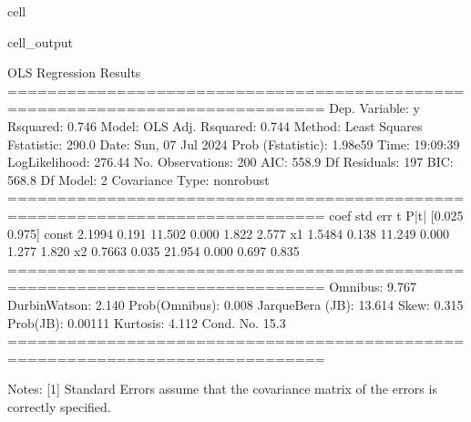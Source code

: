 \documentclass[letterpaper,10pt,english]{jupyterBook}
\begin{document}
\begin{sphinxuseclass}{cell}
\begin{sphinxVerbatimOutput}
\begin{sphinxuseclass}{cell_output}
\begin{sphinxVerbatim}[commandchars=\\\{\}]
                            OLS Regression Results                            
==============================================================================
Dep. Variable:                      y   R\PYGZhy{}squared:                       0.746
Model:                            OLS   Adj. R\PYGZhy{}squared:                  0.744
Method:                 Least Squares   F\PYGZhy{}statistic:                     290.0
Date:                Sun, 07 Jul 2024   Prob (F\PYGZhy{}statistic):           1.98e\PYGZhy{}59
Time:                        19:09:39   Log\PYGZhy{}Likelihood:                \PYGZhy{}276.44
No. Observations:                 200   AIC:                             558.9
Df Residuals:                     197   BIC:                             568.8
Df Model:                           2                                         
Covariance Type:            nonrobust                                         
==============================================================================
                 coef    std err          t      P\PYGZgt{}|t|      [0.025      0.975]
\PYGZhy{}\PYGZhy{}\PYGZhy{}\PYGZhy{}\PYGZhy{}\PYGZhy{}\PYGZhy{}\PYGZhy{}\PYGZhy{}\PYGZhy{}\PYGZhy{}\PYGZhy{}\PYGZhy{}\PYGZhy{}\PYGZhy{}\PYGZhy{}\PYGZhy{}\PYGZhy{}\PYGZhy{}\PYGZhy{}\PYGZhy{}\PYGZhy{}\PYGZhy{}\PYGZhy{}\PYGZhy{}\PYGZhy{}\PYGZhy{}\PYGZhy{}\PYGZhy{}\PYGZhy{}\PYGZhy{}\PYGZhy{}\PYGZhy{}\PYGZhy{}\PYGZhy{}\PYGZhy{}\PYGZhy{}\PYGZhy{}\PYGZhy{}\PYGZhy{}\PYGZhy{}\PYGZhy{}\PYGZhy{}\PYGZhy{}\PYGZhy{}\PYGZhy{}\PYGZhy{}\PYGZhy{}\PYGZhy{}\PYGZhy{}\PYGZhy{}\PYGZhy{}\PYGZhy{}\PYGZhy{}\PYGZhy{}\PYGZhy{}\PYGZhy{}\PYGZhy{}\PYGZhy{}\PYGZhy{}\PYGZhy{}\PYGZhy{}\PYGZhy{}\PYGZhy{}\PYGZhy{}\PYGZhy{}\PYGZhy{}\PYGZhy{}\PYGZhy{}\PYGZhy{}\PYGZhy{}\PYGZhy{}\PYGZhy{}\PYGZhy{}\PYGZhy{}\PYGZhy{}\PYGZhy{}\PYGZhy{}
const          2.1994      0.191     11.502      0.000       1.822       2.577
x1             1.5484      0.138     11.249      0.000       1.277       1.820
x2             0.7663      0.035     21.954      0.000       0.697       0.835
==============================================================================
Omnibus:                        9.767   Durbin\PYGZhy{}Watson:                   2.140
Prob(Omnibus):                  0.008   Jarque\PYGZhy{}Bera (JB):               13.614
Skew:                           0.315   Prob(JB):                      0.00111
Kurtosis:                       4.112   Cond. No.                         15.3
==============================================================================

Notes:
[1] Standard Errors assume that the covariance matrix of the errors is correctly specified.
\end{sphinxVerbatim}

\end{sphinxuseclass}\end{sphinxVerbatimOutput}

\end{sphinxuseclass}
\end{document}
